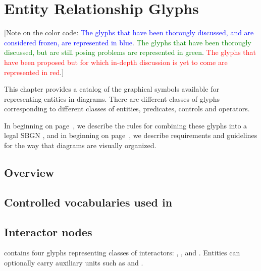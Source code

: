 

\chapter{Entity Relationship Glyphs}

[Note on the color code: \textcolor{blue}{The glyphs that have been thorougly discussed, and are considered frozen, are represented in blue}. \textcolor{green}{The glyphs that have been thorougly discussed, but are still posing problems are represented in green}. \textcolor{red}{The glyphs that have been proposed but for which in-depth discussion is yet to come are represented in red}.]

This chapter provides a catalog of the graphical symbols available for representing entities in \ER diagrams.  There are different classes of glyphs corresponding to different classes of entities, predicates, controls and operators.

In  beginning on page~\pageref{chp:grammar}, we describe the rules for combining these glyphs into a legal SBGN \ER, and in  beginning on page~\pageref{chp:layout}, we describe requirements and guidelines for the way that diagrams are visually organized.

\section{Overview}
 

 
\section{Controlled vocabularies used in \SBGNERLone}\label{sec:CVs}


 
 
 \section{Interactor nodes}\label{sec:interactors}

\SBGNERLone{} contains four glyphs representing classes of interactors: , ,  and . Entities can optionally carry auxiliary units such as  and .

